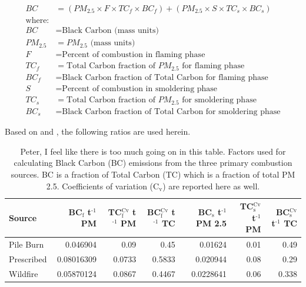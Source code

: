 \documentclass[a4paper]{article}
\begin{document}
\begin{align}
BC &= \left( PM_{2.5} \times F \times TC_f \times BC_f\right) + \left( PM_{2.5} \times S \times TC_s \times BC_s\right) \label{eq-bc} \\
\text{where:} \nonumber \\
BC &= \text{Black Carbon (mass units)} \nonumber \\
PM_{2.5} &= PM_{2.5} \text{ (mass units)} \nonumber \\
F &= \text{Percent of combustion in flaming phase} \nonumber \\
TC_f &= \text{Total Carbon fraction of } PM_{2.5} \text{ for flaming phase} \nonumber \\
BC_f &= \text{Black Carbon fraction of Total Carbon for flaming phase} \nonumber \\
S &= \text{Percent of combustion in smoldering phase} \nonumber \\
TC_s &= \text{Total Carbon fraction of } PM_{2.5} \text{ for smoldering phase} \nonumber \\
BC_s &= \text{Black Carbon fraction of Total Carbon for smoldering phase} \nonumber
\end{align}


Based on \citet{Ward1989} and \citet{Jenk1996}, the following ratios are
used herein.

\begin{table}[htb]
\caption{Peter, I feel like there is too much going on in this table. Factors used for calculating Black Carbon (BC) emissions from the three primary combustion sources. BC is a fraction of Total Carbon (TC) which is a fraction of total PM 2.5. Coefficients of variation (C$_{\text{v}}$) are reported here as well. \label{tab:bc_pm}}
\centering
\begin{tabular}{lrrrrrr}
Source & BC$_{\text{f}}$ t$^{\text{-1}}$ PM & TC$_{\text{f}}^{\text{Cv}}$ t$^{\text{-1}}$ PM & BC$_{\text{f}}^{\text{Cv}}$ t$^{\text{-1}}$ TC & BC$_{\text{s}}$ t$^{\text{-1}}$ PM 2.5 & TC$_{\text{s}}^{\text{Cv}}$ t$^{\text{-1}}$ PM & BC$_{\text{s}}^{\text{Cv}}$ t$^{\text{-1}}$ TC\\
\hline
Pile Burn & 0.046904 & 0.09 & 0.45 & 0.01624 & 0.01 & 0.49\\
Prescribed & 0.08016309 & 0.0733 & 0.5833 & 0.020944 & 0.08 & 0.29\\
Wildfire & 0.05870124 & 0.0867 & 0.4467 & 0.0228641 & 0.06 & 0.338\\
\end{tabular}
\end{table}
\end{document}
